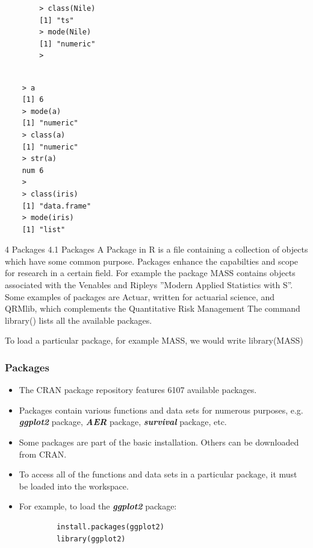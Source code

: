 \documentclass{beamer}
\begin{document}
\begin{frame}[fragile]
	\begin{framed}
		\begin{verbatim}
		> class(Nile)
		[1] "ts"
		> mode(Nile)
		[1] "numeric"
		>
		
		\end{verbatim}
	\end{framed}
	
\end{frame}
\begin{frame}[fragile]
	\begin{verbatim}
	> a
	[1] 6
	> mode(a)
	[1] "numeric"
	> class(a)
	[1] "numeric"
	> str(a)
	num 6
	>
	> class(iris)
	[1] "data.frame"
	> mode(iris)
	[1] "list"
	\end{verbatim}
	
\end{frame}
\begin{frame}
	4 Packages
	4.1 Packages
	A Package in R is a file containing a collection of objects which have some common purpose.
	Packages enhance the capabilties and scope for research in a certain field. For example the
	package MASS contains objects associated with the Venables and Ripleys ”Modern Applied
	Statistics with S”. Some examples of packages are Actuar, written for actuarial science, and
	QRMlib, which complements the Quantitative Risk Management The command library()
	lists all the available packages. 
	
	To load a particular package, for example MASS, we would
	write
	library(MASS)
	
\end{frame}
	\begin{frame}[fragile]
		
		\frametitle{Packages}
		\begin{itemize}
			\item The CRAN package repository features 6107 available packages. 
			\item Packages contain
			various functions and data sets for numerous purposes, e.g.
			\textbf{\textit{ggplot2}} package, \textbf{\textit{AER}} package, \textbf{\textit{survival}} package, etc.
			\item Some packages are part of the basic installation. Others can be
			downloaded from CRAN.
			\item To access all of the functions and data sets in a particular package,
			it must be loaded into the workspace. 
			\item For example, to load the
			\textbf{\textit{ggplot2}} package:
		\end{itemize}
		\begin{framed}
			\begin{verbatim}
			install.packages(ggplot2)
			library(ggplot2)
			\end{verbatim}
		\end{framed}
	\end{frame}
\end{document}
